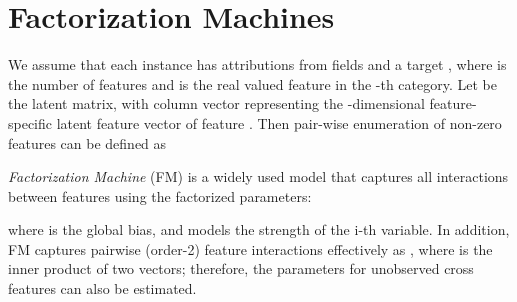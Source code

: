 \documentclass[letterpaper]{article} \usepackage{aaai19}  \usepackage{times}  \usepackage{helvet}  \usepackage{courier}  \usepackage{url}  \usepackage{graphicx}  \frenchspacing  \setlength{\pdfpagewidth}{8.5in}  \setlength{\pdfpageheight}{11in}  \usepackage{mathtools}
\begin{document}
\section{Factorization Machines}\label{sec:fm}

We assume that each instance has attributions  from  fields and a target , where  is the number of features and  is the real valued feature in the -th category.
Let 
be the latent matrix, with column vector
 representing the -dimensional feature-specific latent feature vector of feature . Then pair-wise  enumeration of non-zero features can be defined as


\emph{Factorization Machine} (FM)\cite{rendle2010factorization} is a widely used model that captures all interactions between features using the factorized parameters:

where  is the global bias, and  models the strength of the i-th variable. In addition, FM captures pairwise (order-2) feature interactions effectively as , where  is the inner product of two vectors; therefore, the parameters for unobserved cross features can also be estimated. 
\end{document}
